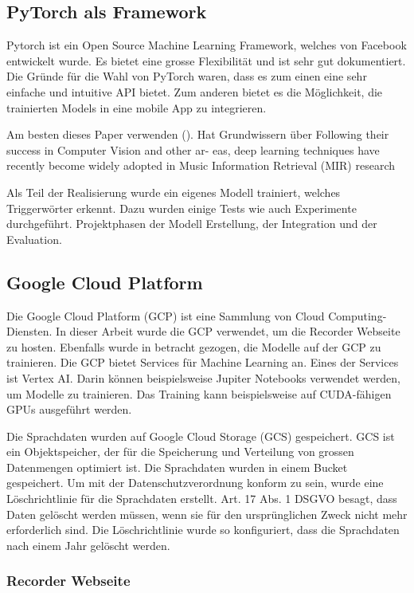 \documentclass[11pt,a4paper]{article}
\begin{document}
\subsection{PyTorch als Framework}
Pytorch ist ein Open Source Machine Learning Framework, welches von Facebook entwickelt wurde. Es
bietet eine grosse Flexibilität und ist sehr gut dokumentiert. Die Gründe für die Wahl von PyTorch
waren, dass es zum einen eine sehr einfache und intuitive API bietet. Zum anderen bietet es die 
Möglichkeit, die trainierten Models in eine mobile App zu integrieren.



Am besten dieses Paper verwenden (\cite{choi2018tutorial}). Hat Grundwissern über 
Following their success in Computer Vision and other ar- eas, deep learning techniques have 
recently become widely adopted in Music Information Retrieval (MIR) research

Als Teil der Realisierung wurde ein eigenes Modell trainiert, welches Triggerwörter erkennt.
Dazu wurden einige Tests wie auch Experimente durchgeführt.
Projektphasen der Modell Erstellung, der Integration und der Evaluation.

\subsection{Google Cloud Platform}
Die Google Cloud Platform (GCP) ist eine Sammlung von Cloud Computing-Diensten. In dieser Arbeit
wurde die GCP verwendet, um die Recorder Webseite zu hosten. Ebenfalls wurde in betracht gezogen,
die Modelle auf der GCP zu trainieren. Die GCP bietet Services für Machine Learning an. Eines der
Services ist Vertex AI. Darin können beispielsweise Jupiter Notebooks verwendet werden, um Modelle
zu trainieren. Das Training kann beispielsweise auf CUDA-fähigen GPUs ausgeführt werden.

\noindent \newline
Die Sprachdaten wurden auf Google Cloud Storage (GCS) gespeichert. GCS ist ein Objektspeicher, der
für die Speicherung und Verteilung von grossen Datenmengen optimiert ist. Die Sprachdaten wurden
in einem Bucket gespeichert. Um mit der Datenschutzverordnung konform zu sein, wurde eine 
Löschrichtlinie für die Sprachdaten erstellt. Art. 17 Abs. 1 DSGVO besagt, dass Daten gelöscht 
werden müssen, wenn sie für den ursprünglichen Zweck nicht mehr erforderlich sind. Die
Löschrichtlinie wurde so konfiguriert, dass die Sprachdaten nach einem Jahr gelöscht werden.

\subsubsection{Recorder Webseite}
\end{document}
